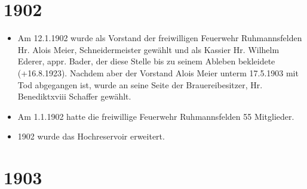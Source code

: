 \documentclass[12pt,a4paper]{book}
\begin{document}
\section*{1902}

\begin{itemize}
\item Am 12.1.1902 wurde als Vorstand der freiwilligen Feuerwehr Ruhmannsfelden
Hr. Alois Meier, Schneidermeister gewählt und als Kassier Hr. Wilhelm Ederer,
appr. Bader, der diese Stelle bis zu seinem Ableben bekleidete (+16.8.1923).
Nachdem aber der Vorstand Alois Meier unterm 17.5.1903 mit Tod abgegangen ist,
wurde an seine Seite der Brauereibesitzer, Hr. Benediktxviii Schaffer gewählt.

\item Am 1.1.1902 hatte die freiwillige Feuerwehr Ruhmannsfelden 55 Mitglieder.

\item 1902 wurde das Hochreservoir erweitert.
\end{itemize}

\section*{1903}
\end{document}
